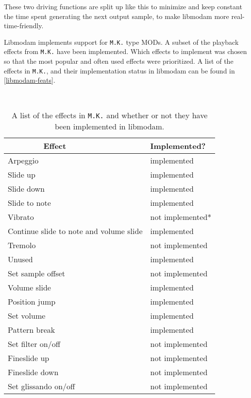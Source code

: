 These two driving functions are split up like this to minimize and keep constant the time spent generating the next output sample, to make libmodam more real-time-friendly.

Libmodam implements support for \texttt{M.K.} type MODs.
A subset of the playback effects from \texttt{M.K.} have been implemented.
Which effects to implement was chosen so that the most popular and often used effects were prioritized.
A list of the effects in \texttt{M.K.}, and their implementation status in libmodam can be found in \ref{libmodam-feats}.

\begin{table}[H]
	\centering
    \caption{A list of the effects in \texttt{M.K.} and whether or not they have been implemented in libmodam.}
    \begin{tabular}{|l|l|}
        \hline
        Effect & Implemented? \\
        \hline
        \hline
        Arpeggio & implemented \\
        \hline
        Slide up & implemented \\
        \hline
        Slide down & implemented \\
        \hline
        Slide to note & implemented \\
        \hline
        Vibrato & not implemented* \\
        \hline
        Continue slide to note and volume slide & implemented \\
        \hline
        Tremolo & not implemented \\
        \hline
        Unused & implemented \\
        \hline
        Set sample offset & not implemented \\
        \hline
        Volume slide & implemented \\
        \hline
        Position jump & implemented \\
        \hline
        Set volume & implemented \\
        \hline
        Pattern break & implemented \\
        \hline
        Set filter on/off & not implemented \\
        \hline
        Fineslide up & not implemented \\
        \hline
        Fineslide down & not implemented \\
        \hline
        Set glissando on/off & not implemented \\
        \hline

\end{tabular}
\end{table}
